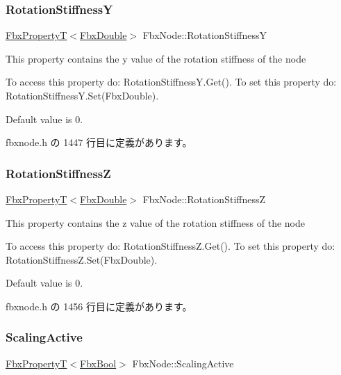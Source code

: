 \subsubsection{\texorpdfstring{Rotation\+StiffnessY}{RotationStiffnessY}}
{\footnotesize\ttfamily \hyperlink{class_fbx_property_t}{Fbx\+PropertyT}$<$\hyperlink{fbxtypes_8h_a171e72a1c46fc15c1a6c9c31948c1c5b}{Fbx\+Double}$>$ Fbx\+Node\+::\+Rotation\+StiffnessY}

This property contains the y value of the rotation stiffness of the node

To access this property do\+: Rotation\+Stiffness\+Y.\+Get(). To set this property do\+: Rotation\+Stiffness\+Y.\+Set(\+Fbx\+Double).

Default value is 0. 

 fbxnode.\+h の 1447 行目に定義があります。

\mbox{\label{class_fbx_node_a9465fe60724712661ce0f0cd3cb26235}} 
\subsubsection{\texorpdfstring{Rotation\+StiffnessZ}{RotationStiffnessZ}}
{\footnotesize\ttfamily \hyperlink{class_fbx_property_t}{Fbx\+PropertyT}$<$\hyperlink{fbxtypes_8h_a171e72a1c46fc15c1a6c9c31948c1c5b}{Fbx\+Double}$>$ Fbx\+Node\+::\+Rotation\+StiffnessZ}

This property contains the z value of the rotation stiffness of the node

To access this property do\+: Rotation\+Stiffness\+Z.\+Get(). To set this property do\+: Rotation\+Stiffness\+Z.\+Set(\+Fbx\+Double).

Default value is 0. 

 fbxnode.\+h の 1456 行目に定義があります。

\mbox{\label{class_fbx_node_a4e49b1c82db99e0b2369e8c9563e5ef7}} 
\subsubsection{\texorpdfstring{Scaling\+Active}{ScalingActive}}
{\footnotesize\ttfamily \hyperlink{class_fbx_property_t}{Fbx\+PropertyT}$<$\hyperlink{fbxtypes_8h_a92e0562b2fe33e76a242f498b362262e}{Fbx\+Bool}$>$ Fbx\+Node\+::\+Scaling\+Active}

